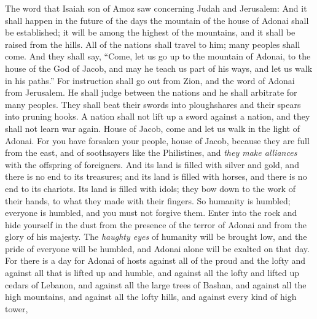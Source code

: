 \begin{biblechapter} %
 The word that Isaiah son of Amoz saw concerning Judah and Jerusalem:
\verse And it shall happen in the future of the days 
the mountain of the house of Adonai shall be established; 
it will be among the highest of the mountains, 
and it shall be raised from the hills. 
All of the nations shall travel to him;
\verse many peoples shall come. 
And they shall say, 
“Come, let us go up to the mountain of Adonai, 
to the house of the God of Jacob, 
and may he teach us part of his ways, 
and let us walk in his paths.” 
For instruction shall go out from Zion, 
and the word of Adonai from Jerusalem.
\verse He shall judge between the nations 
and he shall arbitrate for many peoples. 
They shall beat their swords into ploughshares 
and their spears into pruning hooks. 
A nation shall not lift up a sword against a nation, 
and they shall not learn war again.
 House of Jacob, come and let us walk in the light of Adonai.
\verse For you have forsaken your people, house of Jacob, 
because they are full from the east, 
and of soothsayers like the Philistines, 
and \textit{they make alliances} with the offspring of foreigners.
\verse And its land is filled with silver and gold, 
and there is no end to its treasures; 
and its land is filled with horses, 
and there is no end to its chariots.
\verse Its land is filled with idols; 
they bow down to the work of their hands, 
to what they made with their fingers.
\verse So humanity is humbled; 
everyone is humbled, 
and you must not forgive them.
\verse Enter into the rock 
and hide yourself in the dust 
from the presence of the terror of Adonai 
and from the glory of his majesty.
\verse The \textit{haughty eyes} of humanity will be brought low, 
and the pride of everyone will be humbled, 
and Adonai alone will be exalted on that day.
\verse For there is a day for Adonai of hosts 
against all of the proud and the lofty 
and against all that is lifted up and humble,
\verse and against all the lofty and lifted up cedars of Lebanon, 
and against all the large trees of Bashan,
\verse and against all the high mountains, 
and against all the lofty hills,
\verse and against every kind of high tower, 

\end{biblechapter}
